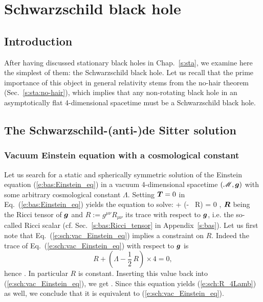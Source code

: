 \chapter{Schwarzschild black hole}
\label{s:sch}

\minitoc

\section{Introduction}

After having discussed stationary black holes in Chap.~\ref{s:sta},
we examine here the simplest of them: the Schwarzschild black hole.
Let us recall that the prime importance of this object
in general relativity stems from the no-hair theorem (Sec.~\ref{s:sta:no-hair}),
which implies that any non-rotating black hole in an asymptotically flat
4-dimensional spacetime must be a Schwarzschild black hole.

\section{The Schwarzschild-(anti-)de Sitter solution}

\subsection{Vacuum Einstein equation with a cosmological constant}

Let us search for a static and spherically symmetric solution of the
Einstein equation (\ref{e:bas:Einstein_eq}) in a vacuum
4-dimensional spacetime $(\mathscr{M},\bm{g})$ with some arbitrary cosmological constant
$\Lambda$. Setting $\bm{T}=0$ in Eq.~(\ref{e:bas:Einstein_eq}) yields
the equation to solve:
\be \label{e:sch:vac_Einstein_eq}
      + \left(\Lambda - \, R\right)  = 0 ,
\ee
$\bm{R}$ being the Ricci tensor of $\bm{g}$ and $R:=g^{\mu\nu} R_{\mu\nu}$ its
trace with respect to $\bm{g}$, i.e. the so-called Ricci scalar
(cf. Sec.~\ref{s:bas:Ricci_tensor} in Appendix~\ref{s:bas}).
Let us first note that Eq.~(\ref{e:sch:vac_Einstein_eq}) implies a
constraint on $R$. Indeed the trace of Eq.~(\ref{e:sch:vac_Einstein_eq})
with respect to $\bm{g}$ is
\[
    R + \left(\Lambda - \frac{1}{2}\, R\right) \times 4 = 0 ,
\]
hence
\be \label{e:sch:R_4Lamb}
     .
\ee
In particular $R$ is constant.
Inserting this value back into (\ref{e:sch:vac_Einstein_eq}), we get
\be \label{e:sch:vac_Einstein_eq_Lamb}
     .
\ee
Since this equation yields (\ref{e:sch:R_4Lamb}) as well, we conclude
that it is equivalent to (\ref{e:sch:vac_Einstein_eq}).

